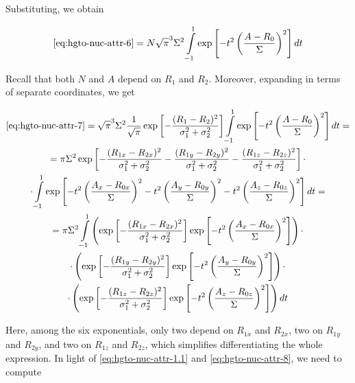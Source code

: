 \documentclass{article}
\begin{document}
\begin{appendices}
Substituting, we obtain

\begin{equation} \label{eq:hgto-nuc-attr-7}
\begin{gathered}
\eqref{eq:hgto-nuc-attr-6} = N \sqrt{\pi}^3 \Sigma^2 \int\limits_{-1}^1 \exp\left[ - t^2 \left(\frac{A-R_0}{\Sigma}\right)^2 \right] dt
\end{gathered}
\end{equation}

Recall that both \(N\) and \(A\) depend on \(R_1\) and \(R_2\). Moreover, expanding in terms of separate coordinates, we get

\begin{equation} \label{eq:hgto-nuc-attr-8}
\begin{gathered}
\eqref{eq:hgto-nuc-attr-7} = \sqrt{\pi}^3 \Sigma^2 \frac{1}{\sqrt\pi} \exp\left[-\frac{(R_1-R_2)^2}{\sigma_1^2 + \sigma_2^2}\right] \int\limits_{-1}^1 \exp\left[ - t^2 \left(\frac{A-R_0}{\Sigma}\right)^2 \right] dt = \\
= \pi \Sigma^2 \exp\left[-\frac{(R_{1x}-R_{2x})^2}{\sigma_1^2 + \sigma_2^2} -\frac{(R_{1y}-R_{2y})^2}{\sigma_1^2 + \sigma_2^2} -\frac{(R_{1z}-R_{2z})^2}{\sigma_1^2 + \sigma_2^2} \right] \cdot \\
\cdot \int\limits_{-1}^1 \exp\left[ - t^2 \left(\frac{A_x-R_{0x}}{\Sigma}\right)^2- t^2 \left(\frac{A_y-R_{0y}}{\Sigma}\right)^2- t^2 \left(\frac{A_z-R_{0z}}{\Sigma}\right)^2 \right] dt = \\
= \pi \Sigma^2 \int\limits_{-1}^1
\left( \exp\left[-\frac{(R_{1x}-R_{2x})^2}{\sigma_1^2 + \sigma_2^2} \right] \exp\left[ - t^2 \left(\frac{A_x-R_{0x}}{\Sigma}\right)^2 \right] \right)
\cdot \\ \cdot
\left( \exp\left[-\frac{(R_{1y}-R_{2y})^2}{\sigma_1^2 + \sigma_2^2} \right] \exp\left[ - t^2 \left(\frac{A_y-R_{0y}}{\Sigma}\right)^2 \right] \right)
\cdot \\ \cdot
\left( \exp\left[-\frac{(R_{1z}-R_{2z})^2}{\sigma_1^2 + \sigma_2^2} \right] \exp\left[ - t^2 \left(\frac{A_z-R_{0z}}{\Sigma}\right)^2 \right] \right)
dt
\end{gathered}
\end{equation}

Here, among the six exponentials, only two depend on \(R_{1x}\) and \(R_{2x}\), two on \(R_{1y}\) and \(R_{2y}\), and two on \(R_{1z}\) and \(R_{2z}\), which simplifies differentiating the whole expression. In light of \eqref{eq:hgto-nuc-attr-1.1} and \eqref{eq:hgto-nuc-attr-8}, we need to compute


\end{appendices}
\end{document}

